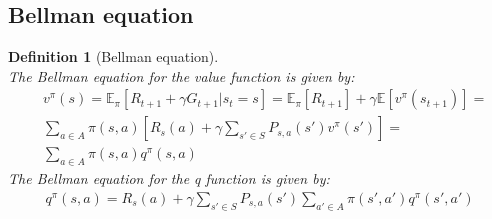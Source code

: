 \documentclass[11pt]{book} %
\newtheorem{definition}{Definition}[section]
\begin{document}
\subsection{Bellman equation}
\begin{definition}[Bellman equation]\ \\
    The Bellman equation for the value function is given by:
    \begin{align*}
        &v^{\pi}(s) = \mathbb{E}_{\pi} \left[ R_{t+1} + \gamma G_{t+1} | s_t = s \right] = \mathbb{E}_{\pi} \left[ R_{t+1} \right] + \gamma \mathbb{E} \left[ v^{\pi}(s_{t+1}) \right]  = \\
        &\sum_{a \in A} \pi(s, a) \left[ R_s(a) + \gamma \sum_{s' \in S} P_{s,a}(s') v^{\pi}(s') \right] = \\
        &\sum_{a \in A} \pi(s, a) q^{\pi}(s, a)
    \end{align*}
    The Bellman equation for the q function is given by:
    \begin{align*}
        q^{\pi}(s, a) = R_s(a) + \gamma \sum_{s' \in S} P_{s,a}(s') \sum_{a' \in A} \pi(s', a') q^{\pi}(s', a')
    \end{align*}
\end{definition}
\end{document}
